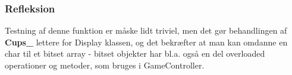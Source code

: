 \documentclass[Modultest/Modultest_main.tex]{subfiles}
\begin{document}
\subsubsection{Refleksion}
Testning af denne funktion er måske lidt triviel, men det gør behandlingen af \textbf{Cups\_} lettere for Display klassen, og det bekræfter at man kan omdanne en char til et bitset array - bitset objekter har bl.a. også en del overloaded operationer og metoder, som bruges i GameController. 
\end{document}
